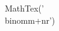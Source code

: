 \documentclass[preview]{standalone}
\begin{document}
\begin{center}
MathTex('\\binom{m+n}{r}')
\end{center}
\end{document}

